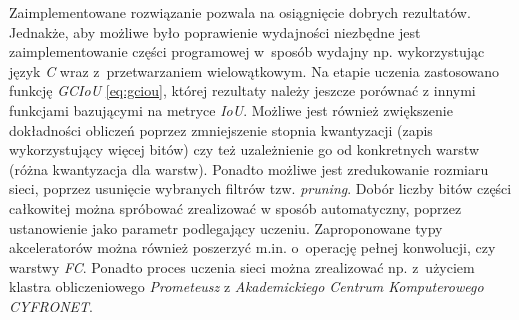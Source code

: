 Zaimplementowane rozwiązanie pozwala na osiągnięcie dobrych rezultatów. 
Jednakże, aby możliwe było poprawienie wydajności niezbędne jest zaimplementowanie części programowej w~sposób wydajny np. wykorzystując język \emph{C} wraz z~przetwarzaniem wielowątkowym.
Na etapie uczenia zastosowano funkcję \emph{GCIoU} \eqref{eq:gciou}, której rezultaty należy jeszcze porównać z innymi funkcjami bazującymi na metryce \emph{IoU}.
Możliwe jest również zwiększenie dokładności obliczeń poprzez zmniejszenie stopnia kwantyzacji (zapis wykorzystujący więcej bitów) czy też uzależnienie go od konkretnych warstw (różna kwantyzacja dla warstw).
Ponadto możliwe jest zredukowanie rozmiaru sieci, poprzez usunięcie wybranych filtrów tzw. \emph{pruning}.
Dobór liczby bitów części całkowitej można spróbować zrealizować w sposób automatyczny, poprzez ustanowienie jako parametr podlegający uczeniu.
Zaproponowane typy akceleratorów można również poszerzyć m.in. o~operację pełnej konwolucji, czy warstwy \emph{FC}.
Ponadto proces uczenia sieci można zrealizować np. z~użyciem klastra obliczeniowego \emph{Prometeusz} z \emph{Akademickiego Centrum
Komputerowego CYFRONET}.
